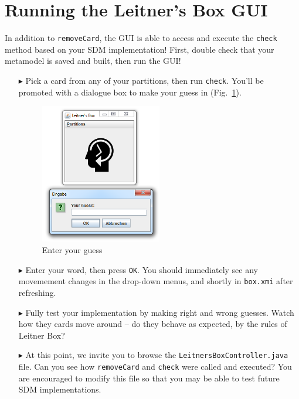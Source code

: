 \newpage
\hypertarget{sec:extendGui}{}
\section{Running the Leitner's Box GUI}
\genHeader

In addition to \texttt{removeCard}, the GUI is able to access and execute the \texttt{check} method based on your SDM implementation! First, double check that
your metamodel is saved and built, then run the GUI! 

\begin{itemize}
\item[$\blacktriangleright$] Pick a card from any of your partitions, then run \texttt{check}. You'll be promoted with a dialogue box to make your guess in
(Fig.~\ref{fig:checkGuess}).

\begin{figure}[htp]
\begin{center}
  \includegraphics[width=0.5\textwidth]{eclipse_checkGuess}
  \caption{Enter your guess}
  \label{fig:checkGuess}
\end{center}
\end{figure}

\item[$\blacktriangleright$] Enter your word, then press \texttt{OK}. You should immediately see any movemement changes in the drop-down menus, and shortly in
\texttt{box.xmi} after refreshing.

\item[$\blacktriangleright$] Fully test your implementation by making right and wrong guesses. Watch how they cards move around -- do they
behave as expected, by the rules of Leitner Box?

\item[$\blacktriangleright$] At this point, we invite you to browse the \texttt{LeitnersBoxController.java} file. Can you see how \texttt{removeCard} and
\texttt{check} were called and executed? You are encouraged to modify this file so that you may be able to test future SDM implementations.

\end{itemize}
